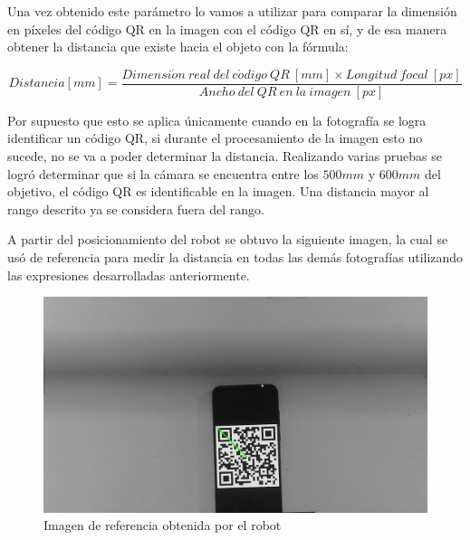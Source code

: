 Una vez obtenido este parámetro lo vamos a utilizar para comparar la dimensión en píxeles del código QR en la imagen con el código QR en sí, y de esa manera obtener la distancia que existe hacia el objeto con la fórmula:

\begin{equation}
   Distancia[mm] = \frac{Dimensi\acute{o}n\ real\ del\ c\acute{o}digo\ QR\ [mm] \times Longitud\ focal\ [px]}{Ancho\ del\ QR\ en\ la\ imagen\ [px]}
   \label{ec:distancia_qr}
\end{equation}

Por supuesto que esto se aplica únicamente cuando en la fotografía se logra identificar un código QR, si durante el procesamiento de la imagen esto no sucede, no se va a poder determinar la distancia. Realizando varias pruebas se logró determinar que si la cámara se encuentra entre los $500mm$ y $600mm$ del objetivo, el código QR es identificable en la imagen. Una distancia mayor al rango descrito ya se considera fuera del rango.

A partir del posicionamiento del robot se obtuvo la siguiente imagen, la cual se usó de referencia para medir la distancia en todas las demás fotografías utilizando las expresiones desarrolladas anteriormente.

\begin{figure}[H]
   \centering
   \includegraphics[width=0.8\linewidth]{images/img_centro.jpg}
   \caption{Imagen de referencia obtenida por el robot}
   \label{fig:img_centro}
\end{figure}
